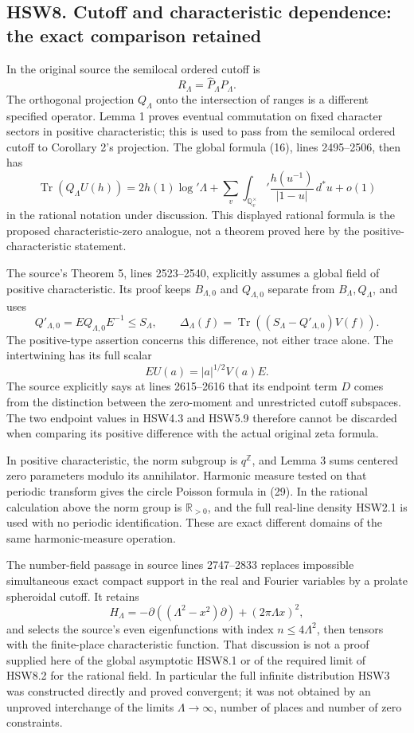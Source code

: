 \subsection{HSW8. Cutoff and characteristic dependence: the exact
comparison
retained}\label{hsw8.-cutoff-and-characteristic-dependence-the-exact-comparison-retained}

In the original source the semilocal ordered cutoff is \[
R_\Lambda=\widehat P_\Lambda P_\Lambda.
\] The orthogonal projection \(Q_\Lambda\) onto the intersection of
ranges is a different specified operator. Lemma 1 proves eventual
commutation on fixed character sectors in positive characteristic; this
is used to pass from the semilocal ordered cutoff to Corollary 2's
projection. The global formula (16), lines 2495--2506, then has \[
\operatorname{Tr}(Q_\Lambda U(h))
=2h(1)\log'\Lambda
+\sum_v\int_{\mathbb Q_v^\times}'\frac{h(u^{-1})}{|1-u|}\,d^*u+o(1)
\tag{HSW8.1}
\] in the rational notation under discussion. This displayed rational
formula is the proposed characteristic-zero analogue, not a theorem
proved here by the positive-characteristic statement.

The source's Theorem 5, lines 2523--2540, explicitly assumes a global
field of positive characteristic. Its proof keeps \(B_{\Lambda,0}\) and
\(Q_{\Lambda,0}\) separate from \(B_\Lambda,Q_\Lambda\), and uses \[
Q'_{\Lambda,0}=E Q_{\Lambda,0}E^{-1}\le S_\Lambda,\qquad
\Delta_\Lambda(f)=
\operatorname{Tr}((S_\Lambda-Q'_{\Lambda,0})V(f)).
\tag{HSW8.2}
\] The positive-type assertion concerns this difference, not either
trace alone. The intertwining has its full scalar \[
EU(a)=|a|^{1/2}V(a)E.
\tag{HSW8.3}
\] The source explicitly says at lines 2615--2616 that its endpoint term
\(D\) comes from the distinction between the zero-moment and
unrestricted cutoff subspaces. The two endpoint values in HSW4.3 and
HSW5.9 therefore cannot be discarded when comparing its positive
difference with the actual original zeta formula.

In positive characteristic, the norm subgroup is \(q^{\mathbb Z}\), and
Lemma 3 sums centered zero parameters modulo its annihilator. Harmonic
measure tested on that periodic transform gives the circle Poisson
formula in (29). In the rational calculation above the norm group is
\(\mathbb R_{>0}\), and the full real-line density HSW2.1 is used with
no periodic identification. These are exact different domains of the
same harmonic-measure operation.

The number-field passage in source lines 2747--2833 replaces impossible
simultaneous exact compact support in the real and Fourier variables by
a prolate spheroidal cutoff. It retains \[
H_\Lambda=-\partial((\Lambda^2-x^2)\partial)+(2\pi\Lambda x)^2,
\] and selects the source's even eigenfunctions with index
\(n\le4\Lambda^2\), then tensors with the finite-place characteristic
function. That discussion is not a proof supplied here of the global
asymptotic HSW8.1 or of the required limit of HSW8.2 for the rational
field. In particular the full infinite distribution HSW3 was constructed
directly and proved convergent; it was not obtained by an unproved
interchange of the limits \(\Lambda\to\infty\), number of places and
number of zero constraints.

